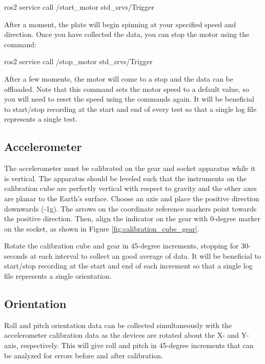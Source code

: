 \begin{bash}
    ros2 service call /start_motor std_srvs/Trigger
\end{bash}

\noindent After a moment, the plate will begin spinning at your specified speed and direction.
Once you have collected the data, you can stop the motor using the command:

\begin{bash}
    ros2 service call /stop_motor std_srvs/Trigger
\end{bash}

\noindent After a few moments, the motor will come to a stop and the data can be offloaded.
Note that this command sets the motor speed to a default value, so you will need to reset the speed using the commands again.
It will be beneficial to start/stop recording at the start and end of every test so that a single log file represents a single test.

\subsection{Accelerometer} 
The accelerometer must be calibrated on the gear and socket apparatus while it is vertical.
The apparatus should be leveled such that the instruments on the calibration cube are perfectly vertical with respect to gravity and the other axes are planar to the Earth's surface.
Choose an axis and place the positive direction downwards (-1g).
The arrows on the coordinate reference markers point towards the positive direction.
Then, align the indicator on the gear with 0-degree marker on the socket, as shown in Figure \ref{fig:calibration_cube_gear}.

Rotate the calibration cube and gear in 45-degree increments, stopping for 30-seconds at each interval to collect an good average of data.
It will be beneficial to start/stop recording at the start and end of each increment so that a single log file represents a single orientation.

\subsection{Orientation} 
Roll and pitch orientation data can be collected simultaneously with the accelerometer calibration data as the devices are rotated about the X- and Y-axis, respectively.
This will give roll and pitch in 45-degree increments that can be analyzed for errors before and after calibration.

